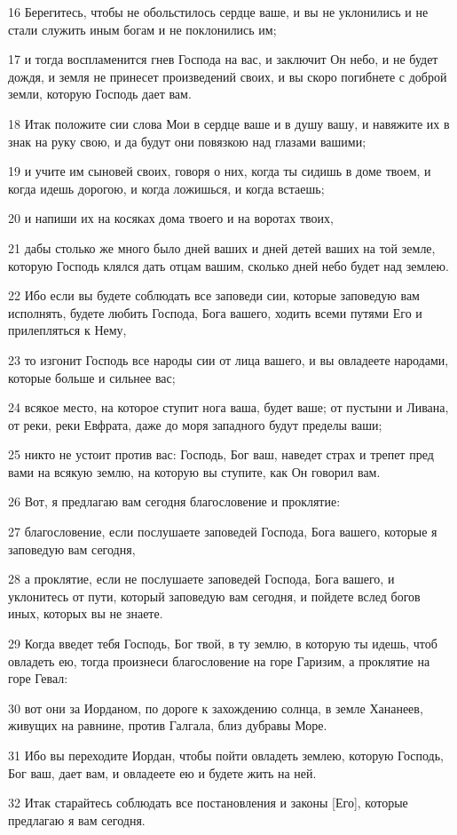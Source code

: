 \par 16 Берегитесь, чтобы не обольстилось сердце ваше, и вы не уклонились и не стали служить иным богам и не поклонились им;
\par 17 и тогда воспламенится гнев Господа на вас, и заключит Он небо, и не будет дождя, и земля не принесет произведений своих, и вы скоро погибнете с доброй земли, которую Господь дает вам.
\par 18 Итак положите сии слова Мои в сердце ваше и в душу вашу, и навяжите их в знак на руку свою, и да будут они повязкою над глазами вашими;
\par 19 и учите им сыновей своих, говоря о них, когда ты сидишь в доме твоем, и когда идешь дорогою, и когда ложишься, и когда встаешь;
\par 20 и напиши их на косяках дома твоего и на воротах твоих,
\par 21 дабы столько же много было дней ваших и дней детей ваших на той земле, которую Господь клялся дать отцам вашим, сколько дней небо будет над землею.
\par 22 Ибо если вы будете соблюдать все заповеди сии, которые заповедую вам исполнять, будете любить Господа, Бога вашего, ходить всеми путями Его и прилепляться к Нему,
\par 23 то изгонит Господь все народы сии от лица вашего, и вы овладеете народами, которые больше и сильнее вас;
\par 24 всякое место, на которое ступит нога ваша, будет ваше; от пустыни и Ливана, от реки, реки Евфрата, даже до моря западного будут пределы ваши;
\par 25 никто не устоит против вас: Господь, Бог ваш, наведет страх и трепет пред вами на всякую землю, на которую вы ступите, как Он говорил вам.
\par 26 Вот, я предлагаю вам сегодня благословение и проклятие:
\par 27 благословение, если послушаете заповедей Господа, Бога вашего, которые я заповедую вам сегодня,
\par 28 а проклятие, если не послушаете заповедей Господа, Бога вашего, и уклонитесь от пути, который заповедую вам сегодня, и пойдете вслед богов иных, которых вы не знаете.
\par 29 Когда введет тебя Господь, Бог твой, в ту землю, в которую ты идешь, чтоб овладеть ею, тогда произнеси благословение на горе Гаризим, а проклятие на горе Гевал:
\par 30 вот они за Иорданом, по дороге к захождению солнца, в земле Хананеев, живущих на равнине, против Галгала, близ дубравы Море.
\par 31 Ибо вы переходите Иордан, чтобы пойти овладеть землею, которую Господь, Бог ваш, дает вам, и овладеете ею и будете жить на ней.
\par 32 Итак старайтесь соблюдать все постановления и законы [Его], которые предлагаю я вам сегодня.

